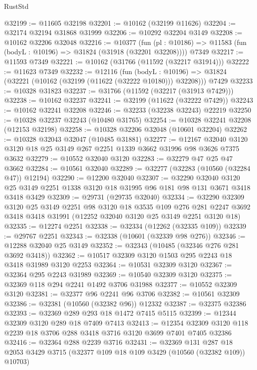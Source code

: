 \begin{lexlean}{RustStd}
\begin{coremodule}
@32199 := @11605 @32198
@32201 := @10162 (@32199 @11626)
@32204 := @32174 @32194 @31868 @31999
@32206 := @10292 @32204 @3149
@32208 := @10162 @32206 @32048
@32216 := @10377
    (fun (pl : @10186) => @11583 (fun (bodyL : @10196) => @31824 (@31918 (@32201 @32208))))
    @7349
@32217 := @11593 @7349
@32221 := @10162 (@31766 (@11592 (@32217 @31914)))
@32222 := @11623 @7349
@32232 := @12116
    (fun (bodyL : @10196) => @31824 (@32221 (@10162 (@32199 (@11622 (@32222 @10180))) @32208)))
    @7429
@32233 := @10328 @31823
@32237 := @31766 (@11592 (@32217 (@31913 @7429)))
@32238 := @10162 @32237
@32241 := @32199 (@11622 (@32222 @7429))
@32243 := @10162 @32241 @32208
@32246 := @32233 (@32238 @32243) @22219
@32250 := @10328 @32237 @32243 (@10480 @31765)
@32254 := @10328 @32241 @32208 (@12153 @32198)
@32258 := @10328 @32206 @32048 (@10601 @32204)
@32262 := @10328 @32043 @32047 (@10485 @31881)
@32277 := @12167
    @32040
    @3120
    @3120
    @18
    @25
    @3149
    @267
    @2251
    @1339
    @3662
    @31996
    @98
    @3626
    @7375
    @3632
@32279 := @10552 @32040 @3120
@32283 := @32279 @47 @25 @47 @3662
@32284 := @10561 @32040
@32289 := @32277 (@32283 (@10560 (@32284 @47)) @12194)
@32290 := @12200 @32040
@32307 := @32290
    @32040
    @3120
    @25
    @3149
    @2251
    @1338
    @3120
    @18
    @31995
    @96
    @181
    @98
    @131
    @3671
    @3418
    @3418
    @3429
@32309 := @29731 (@29735 @32040)
@32334 := @32290
    @32309
    @3120
    @25
    @3149
    @2251
    @98
    @3120
    @18
    @3535
    @109
    @276
    @281
    @2247
    @3692
    @3418
    @3418
    @31991
    (@12252 @32040 @3120 @25 @3149 @2251 @3120 @18)
@32335 := @12274 @2251
@32338 := @32334 (@12262 (@32335 @109))
@32339 := @29767 @2251
@32343 := @32338 (@10601 (@32339 @98 @276))
@32346 := @12288 @32040 @25 @3149
@32352 := @32343 (@10485 (@32346 @276 @281 @3692 @3418))
@32362 := @10517 @32309 @3120 @1503 @295 @2243 @18 @3418 @31989 @3120 @2253
@32364 := @10531 @32309 @3120
@32367 := @32364 @295 @2243 @31989
@32369 := @10540 @32309 @3120
@32375 := @32369 @118 @294 @2241 @1492 @3706 @31988
@32377 := @10552 @32309 @3120
@32381 := @32377 @96 @2241 @96 @3706
@32382 := @10561 @32309
@32386 := @32381 (@10560 (@32382 @96)) @12332
@32387 := @32375 @32386
@32393 := @32369 @289 @293 @18 @1472 @7415 @5115
@32399 := @12344 @32309 @3120 @289 @18 @7409 @7413
@32413 := @12354 @32309 @3120 @118 @2239 @18 @3706 @288 @3418 @3716 @3120 @3699 @7401 @7405 @32386
@32416 := @32364 @288 @2239 @3716
@32431 := @32369
    @131
    @287
    @18
    @2053
    @3429
    @3715
    (@32377 @109 @18 @109 @3429 (@10560 (@32382 @109)) @10703)

\end{coremodule}
\end{lexlean}
